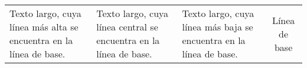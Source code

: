 \begin{tabular}{p{}|m{}|b{}|c}
Texto largo, cuya línea más alta
se encuentra en la línea de base.  
& 
Texto largo, cuya línea central
se encuentra en la línea de base. 
&
Texto largo, cuya línea más baja
se encuentra en la línea de base. 
&
Línea de base
\end{tabular}